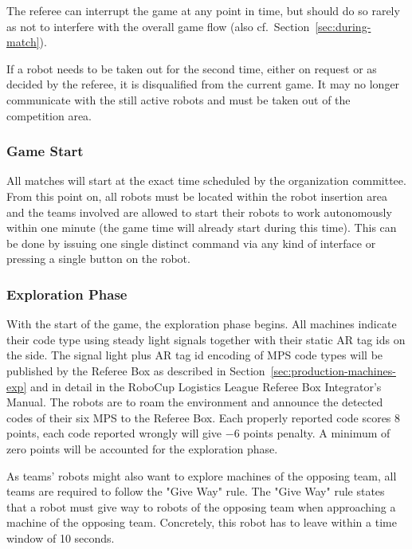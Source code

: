\documentclass[12pt,twoside]{article}
\newcommand{\refsec}[1]{Section~\ref{#1}}
\begin{document}
The referee can interrupt the game at any point in time, but should do
so rarely as not to interfere with the overall game flow (also
cf.~\refsec{sec:during-match}).

If a robot needs to be taken out for the second time, either on
request or as decided by the referee, it is disqualified from the
current game. It may no longer communicate with the still active
robots and must be taken out of the competition area.

\subsubsection{Game Start}
\label{sec:game-start}
%
All matches will start at the exact time scheduled by the organization
committee. From this point on, all robots must be located within the
robot insertion area and the teams involved are allowed to start their
robots to work autonomously within one minute (the game time will
already start during this time). This can be done by issuing one
single distinct command via any kind of interface or pressing a single
button on the robot.

\subsubsection{Exploration Phase}
\label{sec:expphase}
With the start of the game, the exploration phase begins. All machines
indicate their code type using steady light signals together with their 
static AR tag ids on the side. The signal light plus AR tag id
encoding of MPS code types will be published by the Referee Box as
described in \refsec{sec:production-machines-exp} and in detail in the
RoboCup Logistics League Referee Box Integrator's Manual. The robots
are to roam the environment and announce the detected codes of their
six MPS to the Referee Box. Each properly reported
code scores \num{+8} points, each code reported wrongly will give
\num{-6} points penalty. A minimum of zero points will be accounted
for the exploration phase.

As teams' robots might also want to explore machines of the opposing team, 
all teams are required to follow the "Give Way" rule. The "Give Way" rule 
states that a robot must give way to robots of the opposing team when 
approaching a machine of the opposing team. Concretely, this robot has 
to leave within a time window of 10 seconds.
\end{document}
